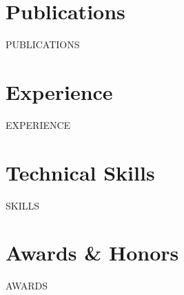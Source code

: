 \documentclass[10pt,letterpaper]{article}
\makeatletter
\newcommand{\expentry}[4]{%
  \vspace{2pt}%
  \begin{tabular*}{\textwidth}[t]{l@{\extracolsep{\fill}}r}%
    \textbf{#1} & \textit{#4} \\%
    \textit{\small #2} & {\small #3} \\%
  \end{tabular*}\par\nopagebreak\vspace{-3pt}%
}
\newcommand{\awardentry}[3]{%
  \vspace{2pt}%
  \begin{tabular*}{\textwidth}[t]{l@{\extracolsep{\fill}}r}%
    \textbf{#1}\enspace---\enspace#2 & \textit{#3} \\%
  \end{tabular*}\vspace{-3pt}%
}
\makeatother
\begin{document}
\section{Publications}
{{PUBLICATIONS}}

\section{Experience}
{{EXPERIENCE}}

\section{Technical Skills}
{{SKILLS}}

\section{Awards \& Honors}
{{AWARDS}}
\end{document}
